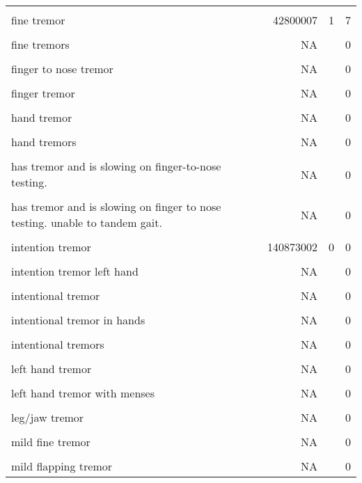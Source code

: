 \documentclass[10pt, letterpaper]{article}
\begin{document}
\begin{spacing}{1.0}
\begin{footnotesize}
\begin{longtable}[H]{p{4in}rrr}
        & & &\\[-6pt]
        fine tremor & 42800007 & 1 & 7\\
        & & &\\[-6pt]
        fine tremors & NA &  & 0\\
        & & &\\[-6pt]
        finger to nose tremor & NA &  & 0\\
        & & &\\[-6pt]
        finger tremor & NA &  & 0\\
        & & &\\[-6pt]
        hand tremor & NA &  & 0\\
        & & &\\[-6pt]
        hand tremors & NA &  & 0\\
        & & &\\[-6pt]
        has tremor and is slowing on finger-to-nose testing. & NA &  & 0\\
        & & &\\[-6pt]
        has tremor and is slowing on finger to nose testing. unable to tandem gait. & NA &  & 0\\
        & & &\\[-6pt]
        intention tremor & 140873002 & 0 & 0\\
        & & &\\[-6pt]
        intention tremor left hand & NA &  & 0\\
        & & &\\[-6pt]
        intentional tremor & NA &  & 0\\
        & & &\\[-6pt]
        intentional tremor in hands & NA &  & 0\\
        & & &\\[-6pt]
        intentional tremors & NA &  & 0\\
        & & &\\[-6pt]
        left hand tremor & NA &  & 0\\
        & & &\\[-6pt]
        left hand tremor with menses & NA &  & 0\\
        & & &\\[-6pt]
        leg/jaw tremor & NA &  & 0\\
        & & &\\[-6pt]
        mild fine tremor & NA &  & 0\\
        & & &\\[-6pt]
        mild flapping tremor & NA &  & 0\\

\end{longtable}
\end{footnotesize}
\end{spacing}
\end{document}
